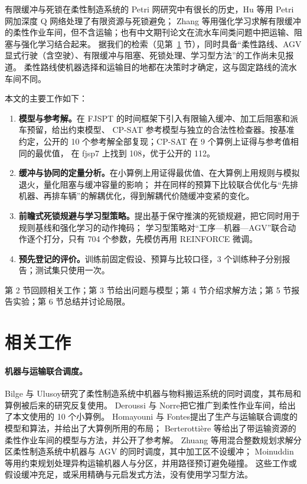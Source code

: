 \documentclass[11pt,a4paper]{ctexart}
\theoremstyle{definition}
\theoremstyle{remark}
\begin{document}
有限缓冲与死锁在柔性制造系统的 Petri 网研究中有很长的历史，Hu 等\cite{hu2020}用 Petri 网加深度 Q 网络处理了有限资源与死锁避免；
Zhang 等\cite{zhang2026}用强化学习求解有限缓冲的柔性作业车间，但不含运输；也有中文期刊论文在流水车间类问题中把运输、阻塞与强化学习结合起来\cite{wangdh2026,yunn2026}。
据我们的检索（见第~\ref{sec:related} 节），同时具备“柔性路线、AGV 显式行驶（含空驶）、有限缓冲与阻塞、死锁处理、学习型方法”的工作尚未见报道。
柔性路线使机器选择和运输目的地都在决策时才确定，这与固定路线的流水车间不同。

本文的主要工作如下：
\begin{enumerate}[nosep]
  \item \textbf{模型与参考解。}在 FJSPT 的时间框架下引入有限输入缓冲、加工后阻塞和派车预留，给出约束模型、
        CP-SAT 参考模型与独立的合法性检查器。按基准约定，公开的 10 个参考解全部复现；CP-SAT 在 9 个算例上证得与参考值相同的最优值，
        在 fjsp7 上找到 108，优于公开的 112。
  \item \textbf{缓冲与协同的定量分析。}在小算例上用证得最优值、在大算例上用规则与模拟退火，量化阻塞与缓冲容量的影响；
        并在同样的预算下比较联合优化与“先排机器、再排车辆”的解耦优化，得到解耦代价随缓冲变紧的变化。
  \item \textbf{前瞻式死锁规避与学习型策略。}提出基于保守推演的死锁规避，把它同时用于规则基线和强化学习的动作掩码；
        学习型策略对“工序—机器—AGV”联合动作逐个打分，只有 704 个参数，先模仿再用 REINFORCE 微调。
  \item \textbf{预先登记的评价。}训练前固定假设、预算与比较口径，3 个训练种子分别报告；测试集只使用一次。
\end{enumerate}

第 2 节回顾相关工作；第 3 节给出问题与模型；第 4 节介绍求解方法；第 5 节报告实验；第 6 节总结并讨论局限。

\section{相关工作}\label{sec:related}

\paragraph{机器与运输联合调度。}
Bilge 与 Ulusoy\cite{bilge1995}研究了柔性制造系统中机器与物料搬运系统的同时调度，其布局和算例被后来的研究反复使用。
Deroussi 与 Norre\cite{deroussi2010}把它推广到柔性作业车间，给出了本文使用的 10 个小算例。
Homayouni 与 Fontes\cite{homayouni2021}提出了生产与运输联合调度的模型和算法，并给出了大算例所用的布局；
Berterottière 等\cite{berterottiere2024}给出了带运输资源的柔性作业车间的模型与方法，并公开了参考解。
Zhuang 等\cite{zhuang2025}用混合整数规划求解分区柔性制造系统中机器与 AGV 的同时调度，其中加工区不设缓冲；
Moinuddin 等\cite{moinuddin2026}用约束规划处理异构运输机器人与分区，并用路径预订避免碰撞。
这些工作或假设缓冲充足，或采用精确与元启发式方法，没有使用学习型方法。
\end{document}
